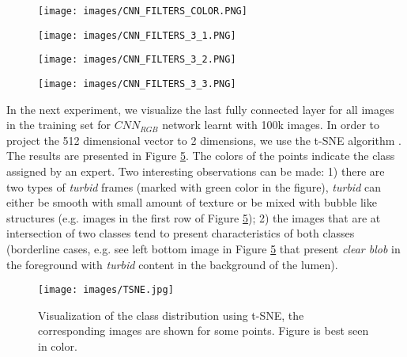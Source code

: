 \documentclass[review,12pt,3p]{elsarticle}
\begin{document}
\begin{figure*}[!ht]
    \centering
    \begin{subfigure}[b]{0.22\textwidth}
        \texttt{[image: images/CNN\_FILTERS\_COLOR.PNG]}
        \caption{}
        \label{fig:1_layers_conv_RGB}
    \end{subfigure}
    \begin{subfigure}[b]{0.22\textwidth}
        \texttt{[image: images/CNN\_FILTERS\_3\_1.PNG]}
        \caption{}
        \label{fig:1_layers_conv_RGBHL1}
    \end{subfigure}
     \begin{subfigure}[b]{0.22\textwidth}
        \texttt{[image: images/CNN\_FILTERS\_3\_2.PNG]}
        \caption{}
        \label{fig:1_layers_conv_RGBHL2}
    \end{subfigure}
     \begin{subfigure}[b]{0.22\textwidth}
        \texttt{[image: images/CNN\_FILTERS\_3\_3.PNG]}
        \caption{}
        \label{fig:1_layers_conv_RGBHL3}
    \end{subfigure}
    \caption{Visualization of the learnt filters: (a) 64 filters from $CNN_{RGB}$, (b) 32 color filters from $CNN^l_{RGBHL}$, (c) 16 Laplacian filters from $CNN^l_{RGBHL}$, (d) 16 Hessian filters from $CNN^l_{RGBHL}$. All filters are $25 \times 25$ pixels. The figure is best seen in color.}
    \label{fig:1_layers_conv}
\end{figure*}

In the next experiment, we visualize the last fully connected layer for all images in the training set for $CNN_{RGB}$ network learnt with 100k images. In order to project the 512 dimensional vector to 2 dimensions, we use the t-SNE algorithm \cite{t_SNE}. The results are presented in Figure \ref{fig:class}. The colors of the points indicate the class assigned by an expert. Two interesting observations can be made: 1) there are two types of \emph{turbid} frames (marked with green color in the figure), \emph{turbid} can either be smooth with small amount of texture or be mixed with bubble like structures (e.g. images in the first row of Figure \ref{fig:class}); 2) the images that are at intersection of two classes tend to present characteristics of both classes (borderline cases, e.g. see left bottom image in Figure \ref{fig:class} that present \emph{clear blob} in the foreground with \emph{turbid} content in the background of the lumen).


\begin{figure}[!ht]
\centering
\texttt{[image: images/TSNE.jpg]}
\caption{Visualization of the class distribution using t-SNE, the corresponding images are shown for some points. Figure is best seen in color.}
\label{fig:class}
\end{figure}
\end{document}
